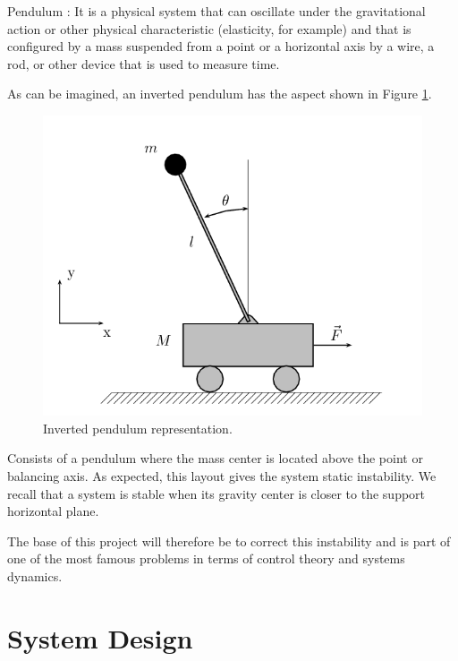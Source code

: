 \begin{definicion}Pendulum \cite{Pendulum}: It is a physical system that can oscillate under the gravitational action or other physical characteristic (elasticity, for example) and that is configured by a mass suspended from a point or a horizontal axis by a wire, a rod, or other device that is used to measure time. \newline
\end{definicion}
As can be imagined, an inverted pendulum has the aspect shown in Figure \ref{fig:pendulo}. 

\begin{figure}[H]
	\center
	\includegraphics[trim = 0mm 0mm 0mm 0mm, clip,scale=1.6]{imagenes/Balancing_robot/pendulo}
	\caption{Inverted pendulum representation.}
	\label{fig:pendulo}
\end{figure}

Consists of a pendulum where the mass center is located above the point or balancing axis. As expected, this layout gives the system static instability. We recall that a system is stable when its gravity center is closer to the support horizontal plane. \newline

The base of this project will therefore be to correct this instability and is part of one of the most famous problems in terms of control theory and systems dynamics. 

\newpage
\section{System Design}\label{sec:Diseno}

